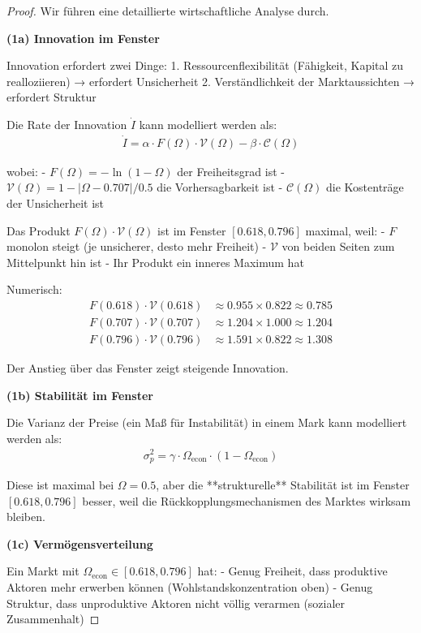 \documentclass[a4paper, 12pt, twoside, openright]{report}
\theoremstyle{definition}
\theoremstyle{definition}
\begin{document}
\begin{proof}

Wir führen eine detaillierte wirtschaftliche Analyse durch.

\textbf{(1a) Innovation im Fenster}

Innovation erfordert zwei Dinge:
1. Ressourcenflexibilität (Fähigkeit, Kapital zu realloziieren) → erfordert Unsicherheit
2. Verständlichkeit der Marktaussichten → erfordert Struktur

Die Rate der Innovation $\dot{I}$ kann modelliert werden als:
\begin{align}
\dot{I} = \alpha \cdot F(\Omega) \cdot \mathcal{V}(\Omega) - \beta \cdot \mathcal{C}(\Omega)
\end{align}

wobei:
- $F(\Omega) = -\ln(1-\Omega)$ der Freiheitsgrad ist
- $\mathcal{V}(\Omega) = 1 - |\Omega - 0.707|/0.5$ die Vorhersagbarkeit ist
- $\mathcal{C}(\Omega)$ die Kostenträge der Unsicherheit ist

Das Produkt $F(\Omega) \cdot \mathcal{V}(\Omega)$ ist im Fenster $[0.618, 0.796]$ maximal, weil:
- $F$ monolon steigt (je unsicherer, desto mehr Freiheit)
- $\mathcal{V}$ von beiden Seiten zum Mittelpunkt hin ist
- Ihr Produkt ein inneres Maximum hat

Numerisch:
\begin{align}
F(0.618) \cdot \mathcal{V}(0.618) &\approx 0.955 \times 0.822 \approx 0.785 \\
F(0.707) \cdot \mathcal{V}(0.707) &\approx 1.204 \times 1.000 \approx 1.204 \\
F(0.796) \cdot \mathcal{V}(0.796) &\approx 1.591 \times 0.822 \approx 1.308
\end{align}

Der Anstieg über das Fenster zeigt steigende Innovation.

\textbf{(1b) Stabilität im Fenster}

Die Varianz der Preise (ein Maß für Instabilität) in einem Mark kann modelliert werden als:
\begin{align}
\sigma_p^2 = \gamma \cdot \Omega_{\text{econ}} \cdot (1 - \Omega_{\text{econ}})
\end{align}

Diese ist maximal bei $\Omega = 0.5$, aber die **strukturelle** Stabilität ist im Fenster $[0.618, 0.796]$ besser, weil die Rückkopplungsmechanismen des Marktes wirksam bleiben.

\textbf{(1c) Vermögensverteilung}

Ein Markt mit $\Omega_{\text{econ}} \in [0.618, 0.796]$ hat:
- Genug Freiheit, dass produktive Aktoren mehr erwerben können (Wohlstandskonzentration oben)
- Genug Struktur, dass unproduktive Aktoren nicht völlig verarmen (sozialer Zusammenhalt)


\end{proof}
\end{document}

